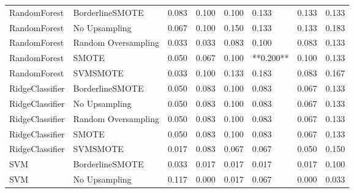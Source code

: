 \begin{tabular}{llllllll}
                RandomForest &     BorderlineSMOTE & 0.083 &                     0.100 &                 0.100 &                  0.133 &                                   0.133 &    0.133 \\
                RandomForest &       No Upsampling & 0.067 &                     0.100 &                 0.150 &                  0.133 &                                   0.133 &    0.183 \\
                RandomForest & Random Oversampling & 0.033 &                     0.033 &                 0.083 &                  0.100 &                                   0.083 &    0.133 \\
                RandomForest &               SMOTE & 0.050 &                     0.067 &                 0.100 &              **0.200** &                                   0.100 &    0.133 \\
                RandomForest &            SVMSMOTE & 0.033 &                     0.100 &                 0.133 &                  0.183 &                                   0.083 &    0.167 \\
             RidgeClassifier &     BorderlineSMOTE & 0.050 &                     0.083 &                 0.100 &                  0.083 &                                   0.067 &    0.133 \\
             RidgeClassifier &       No Upsampling & 0.050 &                     0.083 &                 0.100 &                  0.083 &                                   0.067 &    0.133 \\
             RidgeClassifier & Random Oversampling & 0.050 &                     0.083 &                 0.100 &                  0.083 &                                   0.067 &    0.133 \\
             RidgeClassifier &               SMOTE & 0.050 &                     0.083 &                 0.100 &                  0.083 &                                   0.067 &    0.133 \\
             RidgeClassifier &            SVMSMOTE & 0.017 &                     0.083 &                 0.067 &                  0.067 &                                   0.050 &    0.150 \\
                         SVM &     BorderlineSMOTE & 0.033 &                     0.017 &                 0.017 &                  0.017 &                                   0.017 &    0.100 \\
                         SVM &       No Upsampling & 0.117 &                     0.000 &                 0.017 &                  0.067 &                                   0.000 &    0.033 \\

\end{tabular}
